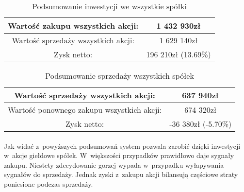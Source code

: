 \begin{table}[H]
	\centering
	\begin{tabular}{| c | c |}
		\hline
		Wartość zakupu wszystkich akcji: & 1 432 930zł\\ \hline
		Wartość sprzedaży wszystkich akcji: & 1 629 140zł\\ \hline
		Zysk netto: & 196 210zł (13.69\%)\\ \hline
	\end{tabular}
	\caption{Podsumowanie inwestycji we wszystkie spółki}
	\label{tab:summaryBuy}
\end{table}

\begin{table}[H]
	\centering
	\begin{tabular}{| c | c |}
		\hline
		Wartość sprzedaży wszystkich akcji: & 637 940zł\\ \hline
		Wartość ponownego zakupu wszystkich akcji: & 674 320zł\\ \hline
		Zysk netto: & -36 380zł (-5.70\%) \\ \hline
	\end{tabular}
	\caption{Podsumowanie sprzedaży wszystkich spółek}
	\label{tab:summarySell}
\end{table}

\paragraph{}
Jak widać z~powyższych podsumowań system pozwala zarobić dzięki inwestycji w~akcje giełdowe spółek. W~większości przypadków prawidłowo daje sygnały zakupu. Niestety zdecydowanie gorzej wypada w~przypadku wyłapywania sygnałów do sprzedaży. Jednak zyski z~zakupu akcji bilansują częściowe straty poniesione podczas sprzedaży.